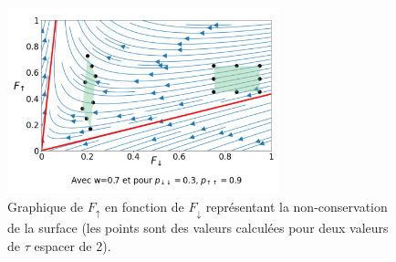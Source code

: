 \documentclass[12pt]{article}
\begin{document}
\begin{figure}[H]
    \centering
    \includegraphics[width=0.7\textwidth]{Graphe/non.cons.png}
    \caption{Graphique de $F_{\uparrow}$ en fonction de $F_{\downarrow}$ représentant la non-conservation de la surface (les points sont des valeurs calculées pour deux valeurs de $\tau$ espacer de 2).}
    \label{fig:non-volume}
\end{figure}
\end{document}
